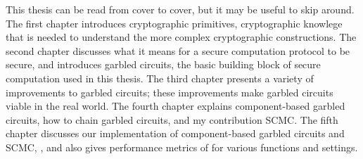 This thesis can be read from cover to cover, but it may be useful to skip around.
The first chapter introduces cryptographic primitives, cryptographic knowlege that is needed to understand the more complex cryptographic constructions.
The second chapter discusses what it means for a secure computation protocol to be secure, and introduces garbled circuits, the basic building block of secure computation used in this thesis.
The third chapter presents a variety of improvements to garbled circuits; these improvements make garbled circuits viable in the real world.
The fourth chapter explains component-based garbled circuits, how to chain garbled circuits, and my contribution SCMC.
The fifth chapter discusses our implementation of component-based garbled circuits and SCMC, \CompGC, and also gives performance metrics of \CompGC for various functions and settings.








